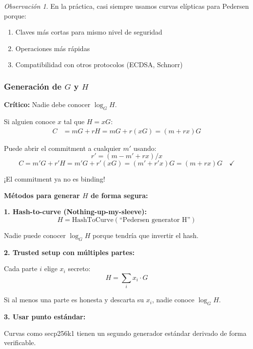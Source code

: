 \documentclass[11pt,a4paper,twoside,openright]{book}
\theoremstyle{definition}
\theoremstyle{plain}
\theoremstyle{remark}
\newtheorem{remark}{Observación}[chapter]
\begin{document}
\begin{remark}
En la práctica, casi siempre usamos curvas elípticas para Pedersen porque:
\begin{enumerate}
    \item Claves más cortas para mismo nivel de seguridad
    \item Operaciones más rápidas
    \item Compatibilidad con otros protocolos (ECDSA, Schnorr)
\end{enumerate}
\end{remark}

\subsubsection{Generación de $G$ y $H$}

\begin{advertencia}
\textbf{Crítico:} Nadie debe conocer $\log_G H$.

Si alguien conoce $x$ tal que $H = xG$:
\begin{align}
C &= mG + rH = mG + r(xG) = (m + rx)G
\end{align}

Puede abrir el commitment a cualquier $m'$ usando:
\[ r' = (m - m' + rx) / x \]
\[ C = m'G + r'H = m'G + r'(xG) = (m' + r'x)G = (m + rx)G \quad \checkmark \]

¡El commitment ya no es binding!
\end{advertencia}

\begin{keyidea}
\textbf{Métodos para generar $H$ de forma segura:}

\textbf{1. Hash-to-curve (Nothing-up-my-sleeve):}
\[ H = \text{HashToCurve}(\text{``Pedersen generator H''}) \]

Nadie puede conocer $\log_G H$ porque tendría que invertir el hash.

\textbf{2. Trusted setup con múltiples partes:}

Cada parte $i$ elige $x_i$ secreto:
\[ H = \sum_i x_i \cdot G \]

Si al menos una parte es honesta y descarta su $x_i$, nadie conoce $\log_G H$.

\textbf{3. Usar punto estándar:}

Curvas como secp256k1 tienen un segundo generador estándar derivado de forma verificable.
\end{keyidea}

\end{document}
